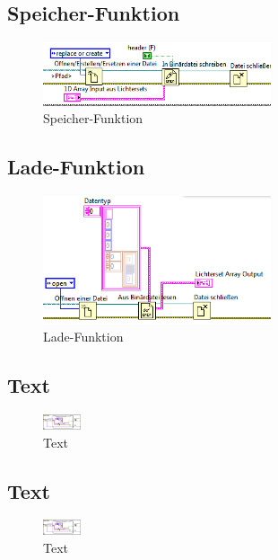 	\subsection{Speicher-Funktion}
	\begin{figure}[h!]
	\centering
		\includegraphics[width=0.6\textwidth]{Pics/speichern.png}
	\caption{Speicher-Funktion}
	\label{fig:a11}
	\end{figure}
	
	\subsection{Lade-Funktion}
	\begin{figure}[h!]
	\centering
		\includegraphics[width=0.6\textwidth]{Pics/laden.png}
	\caption{Lade-Funktion}
	\label{fig:a12}
	\end{figure}
	
	\subsection{Text}
	\begin{figure}[h!]
	\centering
		\includegraphics[width=0.1\textwidth]{Pics/front-kanale.png}
	\caption{Text}
	\label{fig:a13}
	\end{figure}
	
	
	\subsection{Text}
	\begin{figure}[h!]
	\centering
		\includegraphics[width=0.1\textwidth]{Pics/front-kanale.png}
	\caption{Text}
	\label{fig:a14}
	\end{figure}
	
